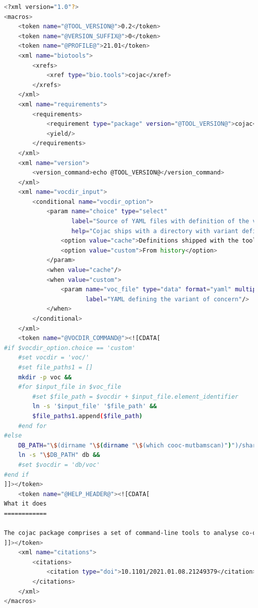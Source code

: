\begin{lstlisting}[language=bash, caption=macros for collection of related Freyja tool wrappers, label=list:methods:wrapper-cojac-macros]
<?xml version="1.0"?>
<macros>
    <token name="@TOOL_VERSION@">0.2</token>
    <token name="@VERSION_SUFFIX@">0</token>
    <token name="@PROFILE@">21.01</token>
    <xml name="biotools">
        <xrefs>
            <xref type="bio.tools">cojac</xref>
        </xrefs>
    </xml>
    <xml name="requirements">
        <requirements>
            <requirement type="package" version="@TOOL_VERSION@">cojac</requirement>
            <yield/>
        </requirements>
    </xml>
    <xml name="version">
        <version_command>echo @TOOL_VERSION@</version_command>
    </xml>
    <xml name="vocdir_input">
        <conditional name="vocdir_option">
            <param name="choice" type="select"
                   label="Source of YAML files with definition of the variant of concerns"
                   help="Cojac ships with a directory with variant definitions yaml files (https://github.com/cbg-ethz/cojac/tree/master/voc), which the tool can access internally. You can also download the latest version of the yaml files from https://github.com/phe-genomics/variant_definitions and use it as a custom yamls defining the variant of concerns.">
                <option value="cache">Definitions shipped with the tool (can be outdated)</option>
                <option value="custom">From history</option>
            </param>
            <when value="cache"/>
            <when value="custom">
                <param name="voc_file" type="data" format="yaml" multiple="true"
                       label="YAML defining the variant of concern"/>
            </when>
        </conditional>
    </xml>
    <token name="@VOCDIR_COMMAND@"><![CDATA[
#if $vocdir_option.choice == 'custom'
    #set vocdir = 'voc/'
    #set file_paths1 = []
    mkdir -p voc &&
    #for $input_file in $voc_file
        #set $file_path = $vocdir + $input_file.element_identifier
        ln -s '$input_file' '$file_path' &&
        $file_paths1.append($file_path)
    #end for
#else
    DB_PATH="\$(dirname "\$(dirname "\$(which cooc-mutbamscan)")")/share/cojac" &&
    ln -s "\$DB_PATH" db &&
    #set $vocdir = 'db/voc'
#end if
]]></token>
    <token name="@HELP_HEADER@"><![CDATA[
What it does
============

The cojac package comprises a set of command-line tools to analyse co-occurrence of mutations on amplicons. It is useful, for example, for early detection of viral variants of concern (e.g. Alpha, Delta, Omicron) in environmental samples, and has been designed to scan for multiple SARS-CoV-2 variants in wastewater samples.
]]></token>
    <xml name="citations">
        <citations>
            <citation type="doi">10.1101/2021.01.08.21249379</citation>
        </citations>
    </xml>
</macros>
\end{lstlisting}
